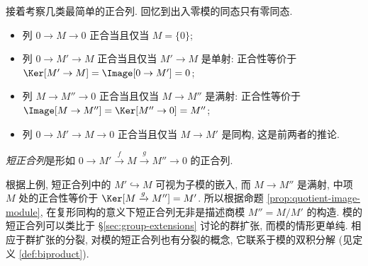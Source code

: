 接着考察几类最简单的正合列. 回忆到出入零模的同态只有零同态.
\begin{itemize}
	\item 列 $0 \to M \to 0$ 正合当且仅当 $M = \{0\}$;
	\item 列 $0 \to M' \to M$ 正合当且仅当 $M' \to M$ 是单射: 正合性等价于 $\Ker[M' \to M] = \Image[0 \to M'] = 0$;
	\item 列 $M \to M'' \to 0$ 正合当且仅当 $M \to M''$ 是满射: 正合性等价于 $\Image[M \to M''] = \Ker[M'' \to 0] = M''$;
	\item 列 $0 \to M' \to M \to 0$ 正合当且仅当 $M \to M'$ 是同构, 这是前两者的推论.
\end{itemize}

\begin{definition}
	\emph{短正合列}是形如 $0 \to M' \xrightarrow{f} M \xrightarrow{g} M'' \to 0$ 的正合列.
\end{definition}
根据上例, 短正合列中的 $M' \hookrightarrow M$ 可视为子模的嵌入, 而 $M \to M''$ 是满射, 中项 $M$ 处的正合性等价于 $\Ker[M \xrightarrow{g} M''] = M'$. 所以根据命题 \ref{prop:quotient-image-module}, 在复形同构的意义下短正合列无非是描述商模 $M'' = M/M'$ 的构造. 模的短正合列可以类比于 \S\ref{sec:group-extensions} 讨论的群扩张, 而模的情形更单纯. 相应于群扩张的分裂, 对模的短正合列也有分裂的概念, 它联系于模的双积分解 (见定义 \ref{def:biproduct}). 

